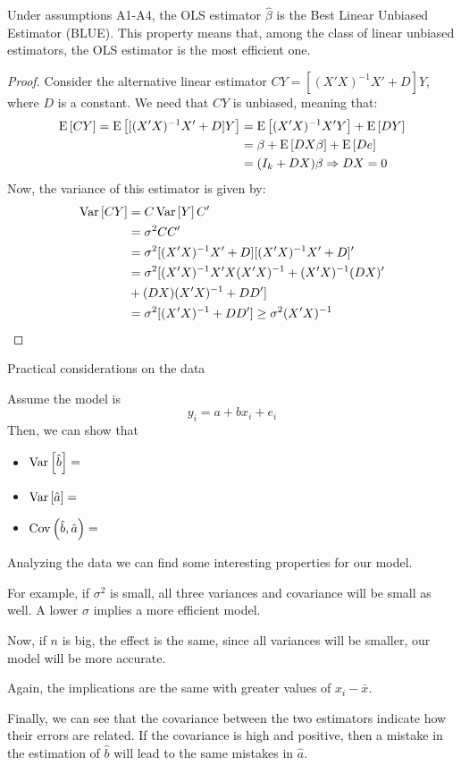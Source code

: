 \begin{proposition}
Under assumptions A1-A4, the OLS estimator $\hat\beta$ is the Best Linear Unbiased Estimator (BLUE). This property means that, among the class of linear unbiased estimators, the OLS estimator is the most efficient one.
\end{proposition}
\begin{proof}
Consider the alternative linear estimator $CY = [(X'X)^{-1}X' + D]Y$, where $D$ is a constant. We need that $CY$ is unbiased, meaning that: \begin{align*}
\operatorname{E}\left[CY\right] = \operatorname{E}\left[[(X'X)^{-1}X' + D]Y\right] & = \operatorname{E}\left[(X'X)^{-1}X'Y\right] + \operatorname{E}\left[DY\right] \\
& = \beta + \operatorname{E}\left[DX\beta\right] + \operatorname{E}\left[De\right] \\
& = (I_k + DX)\beta \Rightarrow DX = 0
\end{align*}
Now, the variance of this estimator is given by: \begin{align*}
\operatorname{Var}\left[CY\right] & = C\operatorname{Var}\left[Y\right]C'\\ & = \sigma^2 CC' \\ & = \sigma^2 [(X'X)^{-1}X' + D][(X'X)^{-1}X' + D]' \\
& = \sigma^2 [(X'X)^{-1}X'X(X'X)^{-1} + (X'X)^{-1}(DX)' \\ & + (DX)(X'X)^{-1} + DD'] \\
& = \sigma^2 [(X'X)^{-1} + DD'] \geq \sigma^2(X'X)^{-1}
\end{align*}
\end{proof}

\begin{bclogo}[couleur=blue!10, arrondi=0.1, logo=,ombre=false]{ Practical considerations on the data} 
\begin{small}
Assume the model is $$y_i = a + bx_i + e_i$$
Then, we can show that \begin{itemize}
\item $\operatorname{Var}\left[\hat b\right] = $
\item $\operatorname{Var}\left[\hat a\right] = $
\item $\operatorname{Cov}\left(\hat b, \hat a\right) = $
\end{itemize}
Analyzing the data we can find some interesting properties for our model.

For example, if $\sigma^2$ is small, all three variances and covariance will be small as well. A lower $\sigma$ implies a more efficient model.

Now, if $n$ is big, the effect is the same, since all variances will be smaller, our model will be more accurate.

Again, the implications are the same with greater values of $x_i - \bar x$.

Finally, we can see that the covariance between the two estimators indicate how their errors are related. If the covariance is high and positive, then a mistake in the estimation of $\hat b$ will lead to the same mistakes in $\hat a$.
\end{small}
\end{bclogo}

